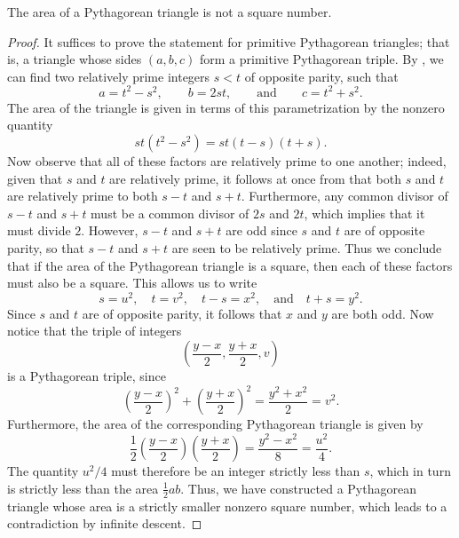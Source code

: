 \begin{theorem}\label{theorem:is-not-square-area-pythagorean-triangle}
  The area of a Pythagorean triangle is not a square number.
\end{theorem}

\begin{proof}
  It suffices to prove the statement for primitive Pythagorean triangles; that is, a triangle whose sides $(a,b,c)$ form a primitive Pythagorean triple. By , we can find two relatively prime integers $s<t$ of opposite parity, such that
  \begin{equation*}
    a=t^2-s^2,\qquad b=2st,\qquad\text{and}\qquad c=t^2+s^2.
  \end{equation*}
  The area of the triangle is given in terms of this parametrization by the nonzero quantity
  \begin{equation*}
    st(t^2-s^2)=st(t-s)(t+s).
  \end{equation*}
  Now observe that all of these factors are relatively prime to one another; indeed, given that $s$ and $t$ are relatively prime, it follows at once from  that both $s$ and $t$ are relatively prime to both $s-t$ and $s+t$. Furthermore, any common divisor of $s-t$ and $s+t$ must be a common divisor of $2s$ and $2t$, which implies that it must divide $2$. However, $s-t$ and $s+t$ are odd since $s$ and $t$ are of opposite parity, so that $s-t$ and $s+t$ are seen to be relatively prime. Thus we conclude that if the area of the Pythagorean triangle is a square, then each of these factors must also be a square. This allows us to write
  \begin{equation*}
    s=u^2,\quad t=v^2,\quad t-s=x^2,\quad\text{and}\quad t+s=y^2.
  \end{equation*}
  Since $s$ and $t$ are of opposite parity, it follows that $x$ and $y$ are both odd. Now notice that the triple of integers
  \begin{equation*}
    \left(\frac{y-x}{2},\frac{y+x}{2},v\right)
  \end{equation*}
  is a Pythagorean triple, since
  \begin{equation*}
    \left(\frac{y-x}{2}\right)^2+\left(\frac{y+x}{2}\right)^2=\frac{y^2+x^2}{2}=v^2.
  \end{equation*}
  Furthermore, the area of the corresponding Pythagorean triangle is given by
  \begin{equation*}
    \frac{1}{2}\left(\frac{y-x}{2}\right)\left(\frac{y+x}{2}\right)=\frac{y^2-x^2}{8}=\frac{u^2}{4}.
  \end{equation*}
  The quantity $u^2/4$ must therefore be an integer strictly less than $s$, which in turn is strictly less than the area $\frac{1}{2}ab$. Thus, we have constructed a Pythagorean triangle whose area is a strictly smaller nonzero square number, which leads to a contradiction by infinite descent.
\end{proof}

